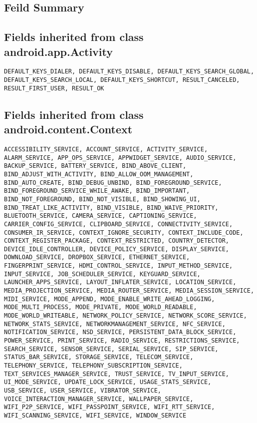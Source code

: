 \subsection{Feild Summary}

\subsection{Fields inherited from class android.app.Activity}


\begin{lstlisting}
DEFAULT_KEYS_DIALER, DEFAULT_KEYS_DISABLE, DEFAULT_KEYS_SEARCH_GLOBAL, DEFAULT_KEYS_SEARCH_LOCAL, DEFAULT_KEYS_SHORTCUT, RESULT_CANCELED, RESULT_FIRST_USER, RESULT_OK
\end{lstlisting}

\subsection{Fields inherited from class android.content.Context}

\begin{lstlisting}
ACCESSIBILITY_SERVICE, ACCOUNT_SERVICE, ACTIVITY_SERVICE, ALARM_SERVICE, APP_OPS_SERVICE, APPWIDGET_SERVICE, AUDIO_SERVICE, BACKUP_SERVICE, BATTERY_SERVICE, BIND_ABOVE_CLIENT, BIND_ADJUST_WITH_ACTIVITY, BIND_ALLOW_OOM_MANAGEMENT, BIND_AUTO_CREATE, BIND_DEBUG_UNBIND, BIND_FOREGROUND_SERVICE, BIND_FOREGROUND_SERVICE_WHILE_AWAKE, BIND_IMPORTANT, BIND_NOT_FOREGROUND, BIND_NOT_VISIBLE, BIND_SHOWING_UI, BIND_TREAT_LIKE_ACTIVITY, BIND_VISIBLE, BIND_WAIVE_PRIORITY, BLUETOOTH_SERVICE, CAMERA_SERVICE, CAPTIONING_SERVICE, CARRIER_CONFIG_SERVICE, CLIPBOARD_SERVICE, CONNECTIVITY_SERVICE, CONSUMER_IR_SERVICE, CONTEXT_IGNORE_SECURITY, CONTEXT_INCLUDE_CODE, CONTEXT_REGISTER_PACKAGE, CONTEXT_RESTRICTED, COUNTRY_DETECTOR, DEVICE_IDLE_CONTROLLER, DEVICE_POLICY_SERVICE, DISPLAY_SERVICE, DOWNLOAD_SERVICE, DROPBOX_SERVICE, ETHERNET_SERVICE, FINGERPRINT_SERVICE, HDMI_CONTROL_SERVICE, INPUT_METHOD_SERVICE, INPUT_SERVICE, JOB_SCHEDULER_SERVICE, KEYGUARD_SERVICE, LAUNCHER_APPS_SERVICE, LAYOUT_INFLATER_SERVICE, LOCATION_SERVICE, MEDIA_PROJECTION_SERVICE, MEDIA_ROUTER_SERVICE, MEDIA_SESSION_SERVICE, MIDI_SERVICE, MODE_APPEND, MODE_ENABLE_WRITE_AHEAD_LOGGING, MODE_MULTI_PROCESS, MODE_PRIVATE, MODE_WORLD_READABLE, MODE_WORLD_WRITEABLE, NETWORK_POLICY_SERVICE, NETWORK_SCORE_SERVICE, NETWORK_STATS_SERVICE, NETWORKMANAGEMENT_SERVICE, NFC_SERVICE, NOTIFICATION_SERVICE, NSD_SERVICE, PERSISTENT_DATA_BLOCK_SERVICE, POWER_SERVICE, PRINT_SERVICE, RADIO_SERVICE, RESTRICTIONS_SERVICE, SEARCH_SERVICE, SENSOR_SERVICE, SERIAL_SERVICE, SIP_SERVICE, STATUS_BAR_SERVICE, STORAGE_SERVICE, TELECOM_SERVICE, TELEPHONY_SERVICE, TELEPHONY_SUBSCRIPTION_SERVICE, TEXT_SERVICES_MANAGER_SERVICE, TRUST_SERVICE, TV_INPUT_SERVICE, UI_MODE_SERVICE, UPDATE_LOCK_SERVICE, USAGE_STATS_SERVICE, USB_SERVICE, USER_SERVICE, VIBRATOR_SERVICE, VOICE_INTERACTION_MANAGER_SERVICE, WALLPAPER_SERVICE, WIFI_P2P_SERVICE, WIFI_PASSPOINT_SERVICE, WIFI_RTT_SERVICE, WIFI_SCANNING_SERVICE, WIFI_SERVICE, WINDOW_SERVICE
\end{lstlisting}

